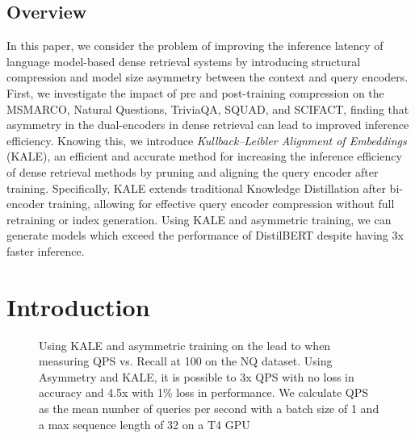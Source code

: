 \subsection{Overview}
In this paper, we consider the problem of improving the inference latency of language model-based dense retrieval systems by introducing structural compression and model size asymmetry between the context and query encoders. First, we investigate the impact of pre and post-training compression on the MSMARCO, Natural Questions, TriviaQA, SQUAD, and SCIFACT, finding that asymmetry in the dual-encoders in dense retrieval can lead to improved inference efficiency. Knowing this, we introduce \emph{Kullback–Leibler Alignment of Embeddings} (KALE), an efficient and accurate method for increasing the inference efficiency of dense retrieval methods by pruning and aligning the query encoder after training. Specifically, KALE extends traditional Knowledge Distillation after bi-encoder training, allowing for effective query encoder compression without full retraining or index generation. Using KALE and asymmetric training, we can generate models which exceed the performance of DistilBERT despite having 3x faster inference. 
\section{Introduction}
\begin{figure}[!htb]
    \centering
    \caption{Using KALE and asymmetric training on the lead to when measuring QPS vs. Recall at 100 on the NQ dataset. Using Asymmetry and KALE, it is possible to 3x QPS with no loss in accuracy and 4.5x with 1\% loss in performance. We calculate QPS as the mean number of queries per second with a batch size of 1 and a max sequence length of 32 on a T4 GPU}
    \label{fig:speed}
\end{figure}

